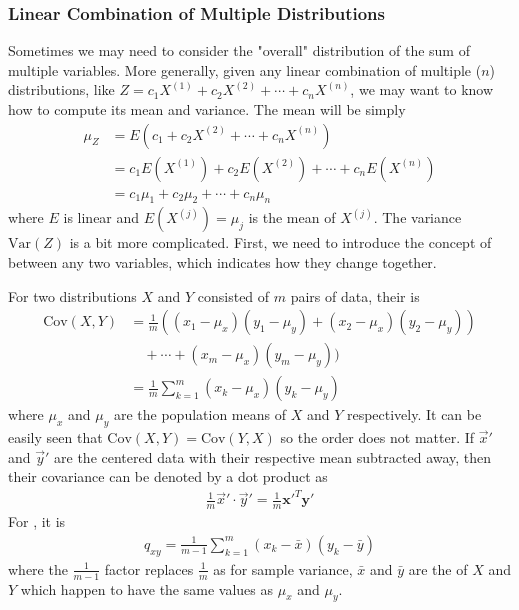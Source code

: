 \subsubsection{Linear Combination of Multiple Distributions}
Sometimes we may need to consider the "overall" distribution of the sum of multiple variables. More generally, given any linear combination of multiple ($n$) distributions, like $Z = c_1X^{(1)} + c_2X^{(2)} + \cdots + c_nX^{(n)}$, we may want to know how to compute its mean and variance. The mean will be simply 
\begin{align*}
\mu_Z &= E(c_1 + c_2X^{(2)} + \cdots + c_nX^{(n)}) \\
&= c_1E(X^{(1)}) + c_2E(X^{(2)}) + \cdots + c_nE(X^{(n)}) \\
&= c_1\mu_1 + c_2\mu_2 + \cdots + c_n\mu_n     
\end{align*}
where $E$ is linear and $E(X^{(j)}) = \mu_j$ is the mean of $X^{(j)}$. The variance $\text{Var}(Z)$ is a bit more complicated. First, we need to introduce the concept of  between any two variables, which indicates how they change together.
\begin{defn}
\label{defn:covariance}
For two distributions $X$ and $Y$ consisted of $m$ pairs of data, their  is
\begin{align*}
\text{Cov}(X,Y) &= \frac{1}{m}((x_1-\mu_x)(y_1-\mu_y) + (x_2-\mu_x)(y_2-\mu_y)) \\
&\quad + \cdots + (x_m-\mu_x)(y_m-\mu_y)) \\
&= \frac{1}{m}\sum_{k=1}^{m} (x_k-\mu_x)(y_k-\mu_y)
\end{align*}
where $\mu_x$ and $\mu_y$ are the population means of $X$ and $Y$ respectively. It can be easily seen that $\text{Cov}(X,Y) = \text{Cov}(Y,X)$ so the order does not matter. If $\vec{x}'$ and $\vec{y}'$ are the centered data with their respective mean subtracted away, then their covariance can be denoted by a dot product as
\begin{align*}
\frac{1}{m} \vec{x}' \cdot \vec{y}' = \frac{1}{m} \textbf{x}'^T \textbf{y}'
\end{align*}
For , it is
\begin{align*}
q_{xy} = \frac{1}{m-1} \sum_{k=1}^{m} (x_k-\bar{x})(y_k-\bar{y})
\end{align*}
where the $\frac{1}{m-1}$ factor replaces $\frac{1}{m}$ as for sample variance, $\bar{x}$ and $\bar{y}$ are the  of $X$ and $Y$ which happen to have the same values as $\mu_x$ and $\mu_y$.
\end{defn}
